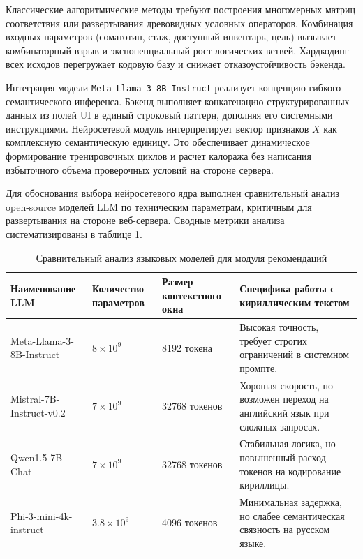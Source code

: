 \documentclass[14pt, a4paper]{extarticle}
\begin{document}
Классические алгоритмические методы требуют построения многомерных матриц соответствия или развертывания древовидных условных операторов. Комбинация входных параметров (соматотип, стаж, доступный инвентарь, цель) вызывает комбинаторный взрыв и экспоненциальный рост логических ветвей. Хардкодинг всех исходов перегружает кодовую базу и снижает отказоустойчивость бэкенда.

Интеграция модели \texttt{Meta-Llama-3-8B-Instruct} реализует концепцию гибкого семантического инференса. Бэкенд выполняет конкатенацию структурированных данных из полей UI в единый строковый паттерн, дополняя его системными инструкциями. Нейросетевой модуль интерпретирует вектор признаков $X$ как комплексную семантическую единицу. Это обеспечивает динамическое формирование тренировочных циклов и расчет калоража без написания избыточного объема проверочных условий на стороне сервера.\cite{llama3,ml_theory}

Для обоснования выбора нейросетевого ядра выполнен сравнительный анализ open-source моделей LLM по техническим параметрам, критичным для развертывания на стороне веб-сервера. Сводные метрики анализа систематизированы в таблице \ref{tab:llm_compare}.

\begin{table}[H]
\centering
\small
\caption{Сравнительный анализ языковых моделей для модуля рекомендаций}
\label{tab:llm_compare}
\begin{tabular}{|p{3.2cm}|p{2.7cm}|p{3.2cm}|p{5.0cm}|}
\hline
\textbf{Наименование LLM} & \textbf{Количество параметров} & \textbf{Размер контекстного окна} & \textbf{Специфика работы с кириллическим текстом} \\
\hline
Meta-Llama-3-8B-Instruct & $8 \times 10^9$ & 8192 токена & Высокая точность, требует строгих ограничений в системном промпте. \\
\hline
Mistral-7B-Instruct-v0.2 & $7 \times 10^9$ & 32768 токенов & Хорошая скорость, но возможен переход на английский язык при сложных запросах. \\
\hline
Qwen1.5-7B-Chat & $7 \times 10^9$ & 32768 токенов & Стабильная логика, но повышенный расход токенов на кодирование кириллицы. \\
\hline
Phi-3-mini-4k-instruct & $3.8 \times 10^9$ & 4096 токенов & Минимальная задержка, но слабее семантическая связность на русском языке. \\
\hline
\end{tabular}
\end{table}
\end{document}
